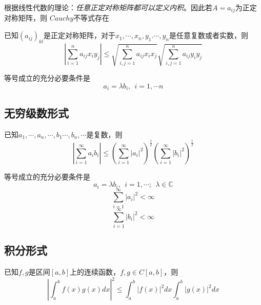 根据线性代数的理论：\textsl{任意正定对称矩阵都可以定义内积}。因此若$A=a_{ij}$为正定对称矩阵，则
$Cauchy$不等式存在
\begin{theorem}
    已知$(a_{ij})_{kl}$是正定对称矩阵，对于$x_1,\cdots,x_n,y_1.\cdots,y_n$是任意复数或者实数，则
    \begin{equation}
        |\sum\limits_{i=1}^{n}a_{ij}x_iy_j|\leqslant \sqrt{\sum\limits_{i,j=1}^{n}a_{ij}x_ix_j}
        \sqrt{\sum\limits_{i,j=1}^{n}a_{ij}y_iy_j}
    \end{equation}

    等号成立的充分必要条件是
    \begin{equation}
        a_i=\lambda b_i,\ \ i=1,\cdots n
    \end{equation}
\end{theorem}

\subsection*{无穷级数形式}

\begin{theorem}
    已知$a_1,\cdots,a_n,\cdots,b_1\cdots,b_n,\cdots$是复数，则
    \begin{equation}
        |\sum\limits_{i=1}^{\infty}a_ib_i|\leqslant 
        (\sum\limits_{i=1}^{\infty}|a_i|^2)^{\frac{1}{2}}
        (\sum\limits_{i=1}^{\infty}|b_i|^2)^{\frac{1}{2}}
    \end{equation}

    等号成立的充分必要条件是
    \begin{equation}
        a_i=\lambda b_i,\ \ i=1,\cdots ;\ \ \lambda\in \mathbb{C}
    \end{equation}
    \begin{equation}
        \sum\limits_{i=1}^{\infty}|a_i|^2<\infty
    \end{equation}
    \begin{equation}
        \sum\limits_{i=1}^{\infty}|b_i|^2<\infty
    \end{equation}
\end{theorem}

\subsection*{积分形式}

\begin{theorem}
    已知$f,g$是区间$[a,b]$上的连续函数，$f,g\in C[a,b]$，则
    \begin{equation}
        |\int_{a}^{b}f(x)g(x)dx|^2\leqslant \int_{a}^{b}|f(x)|^2dx \int_{a}^{b}|g(x)|^2dx 
    \end{equation}
\end{theorem}

